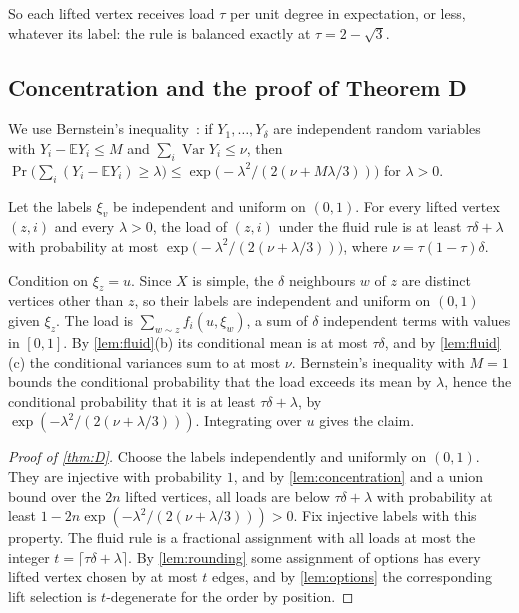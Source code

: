 So each lifted vertex receives load $\tau$ per unit degree in expectation, or less, whatever its label: the rule is
balanced exactly at $\tau=2-\sqrt3$.

\subsection{Concentration and the proof of Theorem D}\label{sec:lifts-proof}

We use Bernstein's inequality~\cite[Section~2.8]{BLM2013}: if $Y_1,\dots,Y_\delta$ are independent random variables
with $Y_i-\mathbb EY_i\le M$ and $\sum_i\operatorname{Var}Y_i\le\nu$, then
$\Pr\bigl(\sum_i(Y_i-\mathbb EY_i)\ge\lambda\bigr)\le\exp\bigl(-\lambda^2/(2(\nu+M\lambda/3))\bigr)$ for $\lambda>0$.

\begin{lemma}[Concentration]\label{lem:concentration}
\notformalized
Let the labels $\xi_v$ be independent and uniform on $(0,1)$. For every lifted vertex $(z,i)$ and every $\lambda>0$,
the load of $(z,i)$ under the fluid rule is at least $\tau\delta+\lambda$ with probability at most
$\exp\bigl(-\lambda^2/(2(\nu+\lambda/3))\bigr)$, where $\nu=\tau(1-\tau)\delta$.
\end{lemma}
\begin{informalproof}
Condition on $\xi_z=u$. Since $X$ is simple, the $\delta$ neighbours $w$ of $z$ are distinct vertices other than $z$, so
their labels are independent and uniform on $(0,1)$ given $\xi_z$. The load is $\sum_{w\sim z}f_i(u,\xi_w)$, a sum of
$\delta$ independent terms with values in $[0,1]$. By \cref{lem:fluid}(b) its conditional mean is at most $\tau\delta$,
and by \cref{lem:fluid}(c) the conditional variances sum to at most $\nu$. Bernstein's inequality with $M=1$ bounds the
conditional probability that the load exceeds its mean by $\lambda$, hence the conditional probability that it is at
least $\tau\delta+\lambda$, by $\exp(-\lambda^2/(2(\nu+\lambda/3)))$. Integrating over $u$ gives the claim.
\end{informalproof}

\begin{proof}[Proof of \cref{thm:D}]
Choose the labels independently and uniformly on $(0,1)$. They are injective with probability $1$, and by
\cref{lem:concentration} and a union bound over the $2n$ lifted vertices, all loads are below $\tau\delta+\lambda$ with
probability at least $1-2n\exp(-\lambda^2/(2(\nu+\lambda/3)))>0$. Fix injective labels with this property. The fluid rule is a
fractional assignment with all loads at most the integer $t=\lceil\tau\delta+\lambda\rceil$. By \cref{lem:rounding} some
assignment of options has every lifted vertex chosen by at most $t$ edges, and by \cref{lem:options} the corresponding
lift selection is $t$-degenerate for the order by position.
\end{proof}

